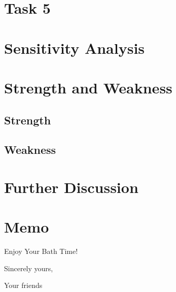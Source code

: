 \documentclass{mcmthesis}
\begin{document}
	\section{Task 5}
	
	\section{Sensitivity Analysis}
	
	\section{Strength and Weakness}
	\subsection{Strength}
	\subsection{Weakness}
	
	\section{Further Discussion}
	
	
	
	\newpage
	\section*{Memo} %
	
	\begin{letter}{Enjoy Your Bath Time!}
		
		
		\vspace{\parskip}
		
		Sincerely yours,
		
		Your friends
		
	\end{letter}
	
	
	
	
	
	
	
	
	
	
	\newpage
	\printbibliography
	
\end{document}
